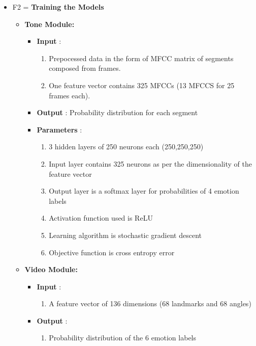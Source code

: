 \documentclass[oneside,a4paper,12pt]{report}
\begin{document}
\begin{normalsize}
\begin{itemize}
\begin{itemize}
\begin{itemize}
\begin{itemize}
			\newline
		\end{itemize}
	\end{itemize}
	\vspace{5mm}
	\item F2  =  \textbf{Training the Models}\\
	\begin{itemize}
		\item \textbf{Tone Module: }
		\begin{itemize}
			\item \textbf{Input} :
			\begin{enumerate}
				\item Prepocessed data in the form of MFCC matrix of segments composed from frames.
				\item  One feature vector contains 325 MFCCs (13 MFCCS for 25 frames each).				
			\end{enumerate}
		
			\item \textbf{Output} : Probability distribution for each segment \newline
			\item \textbf{Parameters} :
			\begin{enumerate}
				\item 3 hidden layers of 250 neurons each (250,250,250)
				\item Input layer contains 325 neurons as per the dimensionality of the feature vector
				\item Output layer is a softmax layer for probabilities of 4 emotion labels
				\item Activation function used is ReLU
				\item Learning algorithm is stochastic gradient descent
				\item Objective function is cross entropy error
			\end{enumerate}
		\end{itemize}
		\vspace{10mm}
		\item \textbf{Video Module: }
		\begin{itemize}
			\item \textbf{Input} :
			\begin{enumerate}
				\item A feature vector of 136 dimensions (68 landmarks and 68 angles)
			\end{enumerate}
		
			\item \textbf{Output} :
			\begin{enumerate}
			\item Probability distribution of the 6 emotion labels
			\end{enumerate}
	

\end{itemize}
\end{itemize}
\end{itemize}
\end{itemize}
\end{normalsize}
\end{document}

